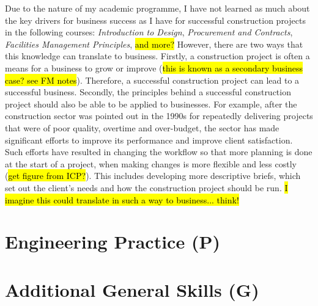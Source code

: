 Due to the nature of my academic programme, I have not learned as much about the key drivers for business success as I have for successful construction projects in the following courses:
\textit{Introduction to Design},
\textit{Procurement and Contracts},
\textit{Facilities Management Principles},
\hl{and more?}
However, there are two ways that this knowledge can translate to business.
Firstly, a construction project is often a means for a business to grow or improve (\hl{this is known as a secondary business case? see FM notes}).
Therefore, a successful construction project can lead to a successful business.
Secondly, the principles behind a successful construction project should also be able to be applied to businesses.
For example, after the construction sector was pointed out in the 1990s for repeatedly delivering projects that were of poor quality, overtime and over-budget, the sector has made significant efforts to improve its performance and improve client satisfaction.
Such efforts have resulted in changing the workflow so that more planning is done at the start of a project, when making changes is more flexible and less costly (\hl{get figure from ICP?}).
This includes developing more descriptive briefs, which set out the client's needs and how the construction project should be run.
\hl{I imagine this could translate in such a way to business... think!}



\section{Engineering Practice (P)}



\section{Additional General Skills (G)}